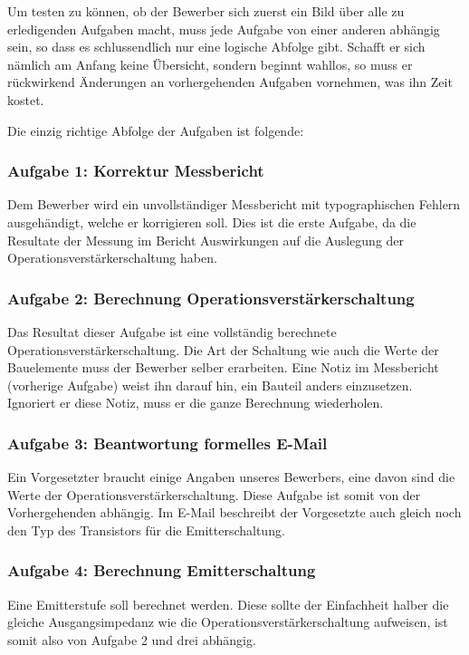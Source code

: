 Um testen zu können, ob der Bewerber sich zuerst ein Bild über alle zu erledigenden Aufgaben macht, muss jede Aufgabe von einer anderen abhängig sein, so dass es schlussendlich nur eine logische Abfolge gibt. Schafft er sich nämlich am Anfang keine Übersicht, sondern beginnt wahllos, so muss er rückwirkend Änderungen an vorhergehenden Aufgaben vornehmen, was ihn Zeit kostet.

Die einzig richtige Abfolge der Aufgaben ist folgende:

\subsubsection{Aufgabe 1: Korrektur Messbericht}
Dem Bewerber wird ein unvollständiger Messbericht mit typographischen Fehlern ausgehändigt, welche er korrigieren soll. %
Dies ist die erste Aufgabe, da die Resultate der Messung im Bericht Auswirkungen auf die Auslegung der Operationsverstärkerschaltung haben.

\subsubsection{Aufgabe 2: Berechnung Operationsverstärkerschaltung}
Das Resultat dieser Aufgabe ist eine vollständig berechnete Operationsverstärkerschaltung. Die Art der Schaltung wie auch die Werte der Bauelemente muss der Bewerber selber erarbeiten. Eine Notiz im Messbericht (vorherige Aufgabe) weist ihn darauf hin, ein Bauteil anders einzusetzen. Ignoriert er diese Notiz, muss er die ganze Berechnung wiederholen.

\subsubsection{Aufgabe 3: Beantwortung formelles E-Mail}
Ein Vorgesetzter braucht einige Angaben unseres Bewerbers, eine davon sind die Werte der Operationsverstärkerschaltung. Diese Aufgabe ist somit von der Vorhergehenden abhängig. Im E-Mail beschreibt der Vorgesetzte auch gleich noch den Typ des Transistors für die Emitterschaltung.

\subsubsection{Aufgabe 4: Berechnung Emitterschaltung}
Eine Emitterstufe soll berechnet werden. Diese sollte der Einfachheit halber die gleiche Ausgangsimpedanz wie die Operationsverstärkerschaltung aufweisen, ist somit also von Aufgabe 2 und drei abhängig. 

